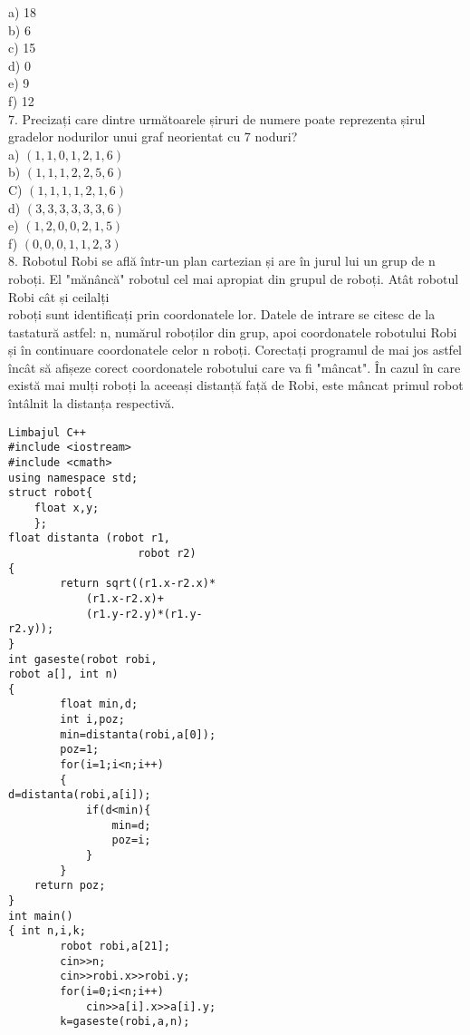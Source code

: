 a) 18\\
b) 6\\
c) 15\\
d) 0\\
e) 9\\
f) 12\\
7. Precizați care dintre următoarele șiruri de numere poate reprezenta șirul gradelor nodurilor unui graf neorientat cu 7 noduri?\\
a) $(1,1,0,1,2,1,6)$\\
b) $(1,1,1,2,2,5,6)$\\
C) $(1,1,1,1,2,1,6)$\\
d) $(3,3,3,3,3,3,6)$\\
e) $(1,2,0,0,2,1,5)$\\
f) $(0,0,0,1,1,2,3)$\\
8. Robotul Robi se află într-un plan cartezian și are în jurul lui un grup de n roboți. El "mănâncă" robotul cel mai apropiat din grupul de roboți. Atât robotul Robi cât și ceilalți\\
roboți sunt identificați prin coordonatele lor. Datele de intrare se citesc de la tastatură astfel: n, numărul roboților din grup, apoi coordonatele robotului Robi și în continuare coordonatele celor n roboți. Corectați programul de mai jos astfel încât să afișeze corect coordonatele robotului care va fi "mâncat". În cazul în care există mai mulți roboți la aceeași distanță față de Robi, este mâncat primul robot întâlnit la distanța respectivă.

\begin{verbatim}
Limbajul C++
#include <iostream>
#include <cmath>
using namespace std;
struct robot{
    float x,y;
    };
float distanta (robot r1,
                    robot r2)
{
        return sqrt((r1.x-r2.x)*
            (r1.x-r2.x)+
            (r1.y-r2.y)*(r1.y-
r2.y));
}
int gaseste(robot robi,
robot a[], int n)
{
        float min,d;
        int i,poz;
        min=distanta(robi,a[0]);
        poz=1;
        for(i=1;i<n;i++)
        {
d=distanta(robi,a[i]);
            if(d<min){
                min=d;
                poz=i;
            }
        }
    return poz;
}
int main()
{ int n,i,k;
        robot robi,a[21];
        cin>>n;
        cin>>robi.x>>robi.y;
        for(i=0;i<n;i++)
            cin>>a[i].x>>a[i].y;
        k=gaseste(robi,a,n);
\end{verbatim}

